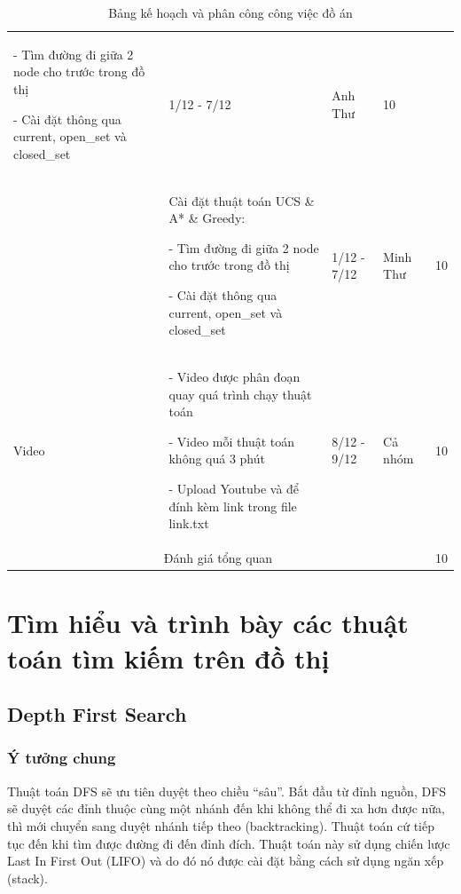 \begin{table}[H]
{\begin{tabular}{|m{1.5cm}|m{6.6cm}|m{2.4cm}|m{2cm}|m{2.7cm}|}
           - Tìm đường đi giữa 2 node cho trước trong đồ thị \par
           - Cài đặt thông qua current, open\_set và closed\_set & 1/12 - 7/12 & Anh Thư & \begin{center} 10 \end{center} \\ \cline{2-5}
                     & Cài đặt thuật toán UCS \& A* \& Greedy: \par
           - Tìm đường đi giữa 2 node cho trước trong đồ thị \par
           - Cài đặt thông qua current, open\_set và closed\_set  & 1/12 - 7/12 & Minh Thư & \begin{center} 10 \end{center} \\ \hline
   \begin{center} Video \end{center} & - Video được phân đoạn quay quá trình chạy thuật toán\par
                - Video mỗi thuật toán không quá 3 phút \par
                - Upload Youtube và để đính kèm link trong file link.txt & 8/12 - 9/12 & Cả nhóm & \begin{center} 10 \end{center} \\ \hline
                \multicolumn{4}{|c}{Đánh giá tổng quan} & \multicolumn{1}{|c|}{10}  \\ \hline
\end{tabular}\par
}
\caption{Bảng kế hoạch và phân công công việc đồ án}
\end{table}

\chapter{Tìm hiểu và trình bày các thuật toán tìm kiếm trên đồ thị}

\section{Depth First Search}
\subsection{Ý tưởng chung}
\hspace{0.42cm}Thuật toán DFS sẽ ưu tiên duyệt theo chiều “sâu”. Bắt đầu từ đỉnh nguồn, DFS sẽ duyệt các đỉnh thuộc cùng một nhánh đến khi không thể đi xa hơn được nữa, thì mới chuyển sang duyệt nhánh tiếp theo (backtracking). Thuật toán cứ tiếp tục đến khi tìm được đường đi đến đỉnh đích. Thuật toán này sử dụng chiến lược Last In First Out (LIFO) và do đó nó được cài đặt bằng cách sử dụng ngăn xếp (stack).
